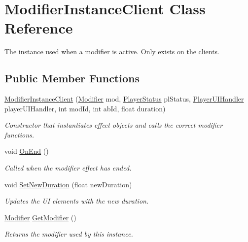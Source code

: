 \hypertarget{class_modifier_instance_client}{}\section{Modifier\+Instance\+Client Class Reference}
\label{class_modifier_instance_client}


The instance used when a modifier is active. Only exists on the clients.  


\subsection*{Public Member Functions}
\begin{DoxyCompactItemize}
\item 
\hyperlink{class_modifier_instance_client_afbdbe5c786c135f6ac463412c34d4dbe}{Modifier\+Instance\+Client} (\hyperlink{class_modifier}{Modifier} mod, \hyperlink{class_player_status}{Player\+Status} pl\+Status, \hyperlink{class_player_u_i_handler}{Player\+U\+I\+Handler} player\+U\+I\+Handler, int mod\+Id, int ab\+Id, float duration)
\begin{DoxyCompactList}\small\item\em Constructor that instantiates effect objects and calls the correct modifier functions. \end{DoxyCompactList}\item 
void \hyperlink{class_modifier_instance_client_a07c777977dc78d7a0ec1d3519b76d5f6}{On\+End} ()
\begin{DoxyCompactList}\small\item\em Called when the modifier effect has ended. \end{DoxyCompactList}\item 
void \hyperlink{class_modifier_instance_client_a1dc19ff93cf2053c841588a689a081dc}{Set\+New\+Duration} (float new\+Duration)
\begin{DoxyCompactList}\small\item\em Updates the UI elements with the new duration. \end{DoxyCompactList}\item 
\hyperlink{class_modifier}{Modifier} \hyperlink{class_modifier_instance_client_a2faa7a2a46489610c86759d4b57d19ac}{Get\+Modifier} ()
\begin{DoxyCompactList}\small\item\em Returns the modifier used by this instance. \end{DoxyCompactList}\item 

\end{DoxyCompactItemize}
